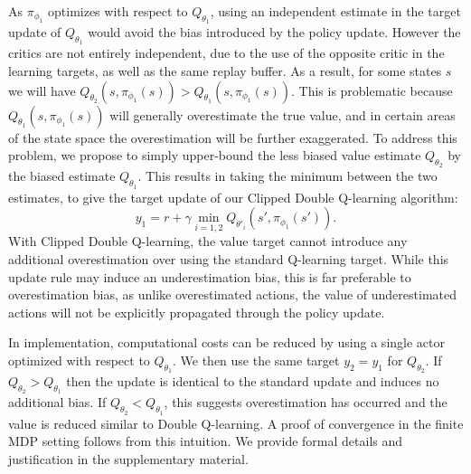 \documentclass{article}
\newcommand{\y}{\gamma}
\newcommand{\E}{\mathbb{E}}
\newcommand{\lb}{\left [}
\newcommand{\rb}{\right ]}
\begin{document}
As $\pi_{\phi_1}$ optimizes with respect to $Q_{\theta_1}$, using an independent estimate in the target update of $Q_{\theta_1}$ would avoid the bias introduced by the policy update. 
However the critics are not entirely independent, due to the use of the opposite critic in the learning targets, as well as the same replay buffer. As a result, for some states $s$ we will have $Q_{\theta_2}(s, \pi_{\phi_1}(s)) > Q_{\theta_1}(s, \pi_{\phi_1}(s))$. 
This is problematic because $Q_{\theta_1}(s, \pi_{\phi_1}(s))$ will generally overestimate the true value, and in certain areas of the state space the overestimation will be further exaggerated.  
To address this problem, we propose to simply upper-bound the less biased value estimate $Q_{\theta_2}$ by the biased estimate $Q_{\theta_1}$. This results in taking the minimum between the two estimates, to give the target update of our Clipped Double Q-learning algorithm: 
\begin{equation}
y_1 = r + \y \min_{i=1,2} Q_{\theta'_i}(s', \pi_{\phi_1}(s')).
\label{eq:clipped}
\end{equation}
With Clipped Double Q-learning, the value target cannot introduce any additional overestimation over using the standard Q-learning target. 
While this update rule may induce an underestimation bias, this is far preferable to overestimation bias, as unlike overestimated actions, the value of underestimated actions will not be explicitly propagated through the policy update. 


In implementation, computational costs can be reduced by using a single actor optimized with respect to $Q_{\theta_1}$. We then use the same target $y_2=y_1$ for $Q_{\theta_2}$. If $Q_{\theta_2} > Q_{\theta_1}$ then the update is identical to the standard update and induces no additional bias. If $Q_{\theta_2} < Q_{\theta_1}$, this suggests overestimation has occurred and the value is reduced similar to Double Q-learning. A proof of convergence in the finite MDP setting follows from this intuition. We provide formal details and justification in the supplementary material.
\end{document}
